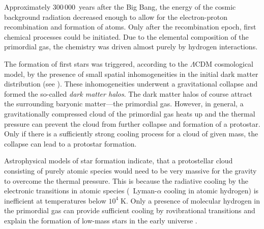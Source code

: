 Approximately $300\,000$~years after the Big Bang, the
energy of the cosmic background radiation decreased enough to allow for the
electron-proton recombination and formation of atoms. Only after the
recombination epoch, first chemical processes could be initiated. Due to the
elemental composition of the primordial gas, the chemistry was driven almost
purely by hydrogen interactions. 

The formation of first stars was triggered, according to the $\Lambda$CDM
cosmological model, by the presence of small spatial inhomogeneities in
the initial dark matter distribution (see \cite{glover2011}).
These inhomogeneities underwent a
gravitational collapse and formed the so-called {\em dark matter halos}.
The dark matter halos of course attract the surrounding baryonic matter---the
primordial gas.
However, in general, a gravitationally compressed cloud of the primordial
gas heats up and the thermal pressure can prevent the cloud from further
collapse and formation of a protostar.
Only if there is a sufficiently
strong cooling process for a cloud of given mass,
the collapse can lead to a protostar formation.

Astrophysical models of star formation indicate, that a protostellar
cloud consisting of purely atomic species would need to be very massive
for the gravity to overcome the thermal pressure. This is because the
radiative
cooling by the electronic transitions in atomic species (\ie\ Lyman-$\alpha$
cooling in atomic hydrogen) is inefficient at temperatures below $10^4\;\text{K}$.
Only
a presence of molecular hydrogen in the primordial gas can provide sufficient
cooling by rovibrational transitions and explain
the formation of low-mass stars in the early universe \citep{palla1983}.

